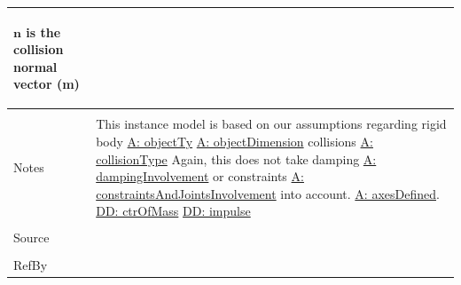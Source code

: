 \documentclass[12pt]{article}
\begin{document}
\begin{minipage}{\textwidth}
\begin{tabular}{p{} p{}}
\begin{symbDescription}
                                                                                           \item{$\mathbf{n}$ is the collision normal vector (m)}
                                                                                           \end{symbDescription}
                                                                                           \\ \midrule \\
                                                                                           Notes & This instance model is based on our assumptions regarding rigid body \hyperref[A:objectTy]{A: objectTy} \hyperref[A:objectDimension]{A: objectDimension} collisions \hyperref[A:collisionType]{A: collisionType} Again, this does not take damping \hyperref[A:dampingInvolvement]{A: dampingInvolvement} or constraints \hyperref[A:constraintsAndJointsInvolvement]{A: constraintsAndJointsInvolvement} into account. \hyperref[A:axesDefined]{A: axesDefined}. \hyperref[DD:ctrOfMass]{DD: ctrOfMass} \hyperref[DD:impulse]{DD: impulse}
                                                                                                   \\ \midrule \\
                                                                                                   Source & \\ \midrule \\
                                                                                                            RefBy & 
\\ \bottomrule \end{tabular}
\end{minipage}\\
\end{document}
